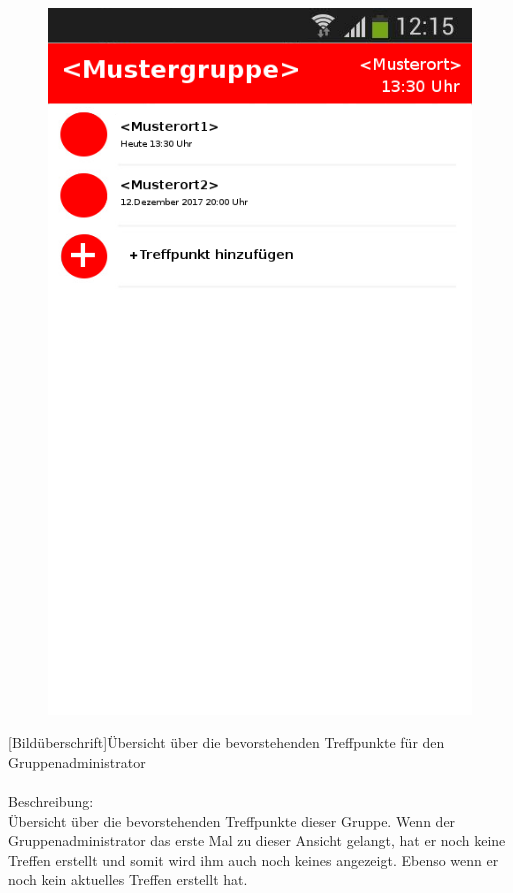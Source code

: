 \begin{figure}
	\includegraphics[scale =1]{resources/images/treffpunktuebersicht_Admin.png}
\end{figure}
[Bildüberschrift]Übersicht über die bevorstehenden Treffpunkte für den Gruppenadministrator\\ \\
[Kleinüberschrift]Beschreibung:\\
Übersicht über die bevorstehenden Treffpunkte dieser Gruppe. Wenn der Gruppenadministrator das erste Mal zu dieser Ansicht gelangt, hat er noch keine Treffen erstellt und somit wird ihm auch noch keines angezeigt. Ebenso wenn er noch kein aktuelles Treffen erstellt hat.\\
